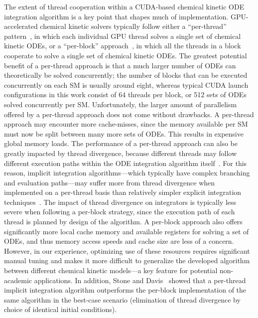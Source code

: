 \documentclass[preprint,review,11pt]{elsarticle}
\begin{document}
The extent of thread cooperation within a CUDA-based chemical kinetic ODE integration algorithm is a key point that shapes much of implementation.
GPU-accelerated chemical kinetic solvers typically follow either a ``per-thread'' pattern~\cite{Niemeyer:2011aa,Stone:2013aa,Niemeyer:2014aa}, in which each individual GPU thread solves a single set of chemical kinetic ODEs, or a ``per-block'' approach~\cite{Stone:2013aa,Sewerin20151375}, in which all the threads in a block cooperate to solve a single set of chemical kinetic ODEs.
The greatest potential benefit of a per-thread approach is that a much larger number of ODEs can theoretically be solved concurrently; the number of blocks that can be executed concurrently on each SM is usually around eight, whereas typical CUDA launch configurations in this work consist of 64 threads per block, or 512 sets of ODEs solved concurrently per SM.
Unfortunately, the larger amount of parallelism offered by a per-thread approach does not come without drawbacks.
A per-thread approach may encounter more cache-misses, since the memory available per SM must now be split between many more sets of ODEs. 
This results in expensive global memory loads.
The performance of a per-thread approach can also be greatly impacted by thread divergence, because different threads may follow different execution paths within the ODE integration algorithm itself~\cite{Stone:2013aa,Niemeyer:2014aa}.
For this reason, implicit integration algorithms---which typically have complex branching and evaluation paths---may suffer more from thread divergence when implemented on a per-thread basis than relatively simpler explicit integration techniques~\cite{Stone:2013aa}.
The impact of thread divergence on integrators is typically less severe when following a per-block strategy, since the execution path of each thread is planned by design of the algorithm.
A per-block approach also offers significantly more local cache memory and available registers for solving a set of ODEs, and thus memory access speeds and cache size are less of a concern.
However, in our experience, optimizing use of these resources requires significant manual tuning and makes it more difficult to generalize the developed algorithm between different chemical kinetic models---a key feature for potential non-academic applications.
In addition, Stone and Davis~\cite{Stone:2013aa} showed that a per-thread implicit integration algorithm outperforms the per-block implementation of the same algorithm in the best-case scenario (elimination of thread divergence by choice of identical initial conditions).
\end{document}
